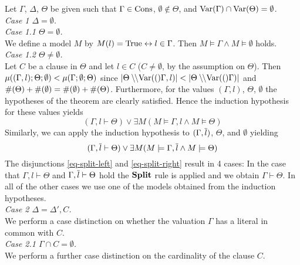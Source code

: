\begin{mytheorem}
{\bigskip

Let $\Gamma$, $\Delta$, $\Theta$ be given such that
$\Gamma\in\mathrm{Cons}$, $\emptyset \notin \Theta$, and 
$\mathrm{Var}(\Gamma) \cap \mathrm{Var}(\Theta) = \emptyset$. \\[1em]
%
\noindent\emph{Case 1 $\Delta = \emptyset$.} \\[1em]
%
\noindent\emph{Case 1.1 $\Theta = \emptyset$.}\\ %
%
We define a model $M$ by 
$M(l) = \mathrm{True} \leftrightarrow l \in \Gamma$. Then 
$M \models \Gamma \land M \models \emptyset$ holds.\\[1em]
%
\noindent\emph{Case 1.2 $\Theta \neq \emptyset$.}\\  
%
Let $C$ be a clause in $\Theta$ and let $l\in C$ ($C\neq\emptyset$, by the 
assumption on $\Theta$). Then 
%
$\mu((\Gamma,l);\Theta;\emptyset) < \mu(\Gamma;\emptyset;\Theta)$
%
since $|\Theta \setminus\!\!\setminus \mathrm{Var}(()\Gamma,l)| < |\Theta \setminus\!\!\setminus \mathrm{Var}(()\Gamma)|$ and $\#(\Theta) + \#(\emptyset) = \#(\emptyset) + \#(\Theta)$. 
Furthermore, for the values $(\Gamma,l)$, $\Theta$, $\emptyset$
the hypotheses of the theorem are clearly satisfied.  
Hence the induction hypothesis for these values yields
%
\begin{equation}\label{eq-split-left}
(\Gamma,l \vdash  \Theta) \lor 
 \exists M(M \models \Gamma,l \wedge M \models \Theta)
\end{equation}
%
Similarly, we can apply the induction hypothesis to 
$(\Gamma,\overline{l})$, $\Theta$, and $\emptyset$ yielding
%
\begin{equation}\label{eq-split-right}
(\Gamma,\overline{l} \vdash  \Theta) \lor 
 \exists M(M \models \Gamma,\overline{l} \wedge M \models \Theta)
\end{equation}
%
The disjunctions \eqref{eq-split-left} and \eqref{eq-split-right} result
in 4 cases:
%
In the case that $\Gamma,l \vdash \Theta$ and $\Gamma, \overline{l} \vdash \Theta$ hold 
the $\mathbf{Split}$ rule is applied and we obtain $\Gamma \vdash \Theta$. 
%
In all of the other cases we use one of the models obtained from the 
induction hypotheses. \\[1em]
%
\noindent\emph{Case 2 $\Delta = \Delta', C$.}\\
%
We perform a case distinction on whether the valuation $\Gamma$ has a 
literal  in common with $C$.\\[1em]
%
\noindent\emph{Case 2.1  $ \Gamma \cap C = \emptyset$.}\\
%
We perform a further case distinction on the cardinality of the clause $C$.\\[1em]
}
\end{mytheorem}
